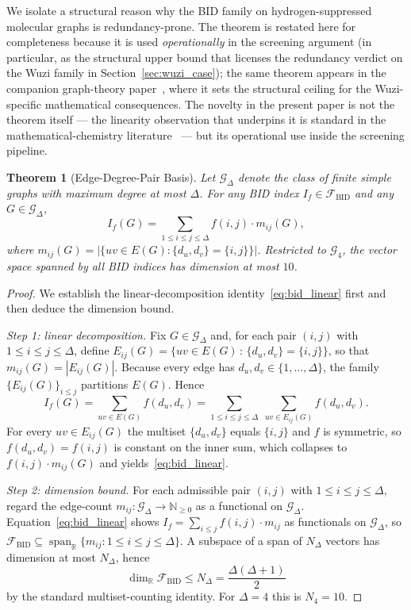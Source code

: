 \documentclass[STIX1COL]{WileyNJDv5}
\newtheorem{theorem}{Theorem}
\theoremstyle{definition}
\newcommand{\bid}{\mathcal{F}_{\mathrm{BID}}}
\begin{document}
We isolate a structural reason why the BID family on
hydrogen-suppressed molecular graphs is redundancy-prone. The
theorem is restated here for completeness because it is used
\emph{operationally} in the screening argument (in particular, as
the structural upper bound that licenses the redundancy
verdict on the Wuzi family in
Section~\ref{sec:wuzi_case}); the same theorem appears in the
companion graph-theory paper~\cite{Paper1_Wuzi}, where it sets
the structural ceiling for the Wuzi-specific mathematical
consequences. The novelty in the present paper is not the theorem
itself --- the linearity observation that underpins it is standard
in the mathematical-chemistry literature~\cite{BorovicaninDasFurtulaGutman2017Zagreb}
--- but its operational use inside the screening pipeline.

\begin{theorem}[Edge-Degree-Pair Basis]\label{thm:bid}
Let $\mathcal{G}_\Delta$ denote the class of finite simple graphs
with maximum degree at most $\Delta$. For any BID index
$I_f\in\bid$ and any $G\in\mathcal{G}_\Delta$,
\begin{equation}\label{eq:bid_linear}
I_f(G)=\sum_{1\le i\le j\le\Delta} f(i,j)\cdot m_{ij}(G),
\end{equation}
where $m_{ij}(G)=\bigl|\{uv\in E(G):\{d_u,d_v\}=\{i,j\}\}\bigr|$.
Restricted to $\mathcal{G}_4$, the vector space spanned by all BID
indices has dimension at most $10$.
\end{theorem}

\begin{proof}
We establish the linear-decomposition identity~\eqref{eq:bid_linear}
first and then deduce the dimension bound.

\emph{Step 1: linear decomposition.} Fix $G\in\mathcal{G}_\Delta$ and,
for each pair $(i,j)$ with $1\le i\le j\le\Delta$, define
$E_{ij}(G) = \{ uv\in E(G) \,:\, \{d_u,d_v\}=\{i,j\}\}$,
so that $m_{ij}(G)=|E_{ij}(G)|$. Because every edge has
$d_u,d_v\in\{1,\ldots,\Delta\}$, the family $\{E_{ij}(G)\}_{i\le j}$
partitions $E(G)$. Hence
\[
I_f(G) = \sum_{uv\in E(G)} f(d_u,d_v)
= \sum_{1\le i\le j\le\Delta}\;\sum_{uv\in E_{ij}(G)} f(d_u,d_v).
\]
For every $uv\in E_{ij}(G)$ the multiset $\{d_u,d_v\}$ equals
$\{i,j\}$ and $f$ is symmetric, so $f(d_u,d_v)=f(i,j)$ is constant
on the inner sum, which collapses to $f(i,j)\cdot m_{ij}(G)$ and
yields~\eqref{eq:bid_linear}.

\emph{Step 2: dimension bound.} For each admissible pair $(i,j)$
with $1\le i\le j\le\Delta$, regard the edge-count
$m_{ij}:\mathcal{G}_\Delta\to\mathbb{N}_{\ge 0}$ as a functional on
$\mathcal{G}_\Delta$. Equation~\eqref{eq:bid_linear} shows
$I_f = \sum_{i\le j} f(i,j)\cdot m_{ij}$ as functionals on
$\mathcal{G}_\Delta$, so
$\bid \subseteq \operatorname{span}_{\mathbb{R}}\{m_{ij}:1\le i\le j\le\Delta\}$.
A subspace of a span of $N_\Delta$ vectors has dimension at most
$N_\Delta$, hence
\[
\dim_{\mathbb{R}}\bid \le N_\Delta = \frac{\Delta(\Delta+1)}{2}
\]
by the standard multiset-counting identity. For $\Delta=4$ this is
$N_4=10$.
\end{proof}
\end{document}
